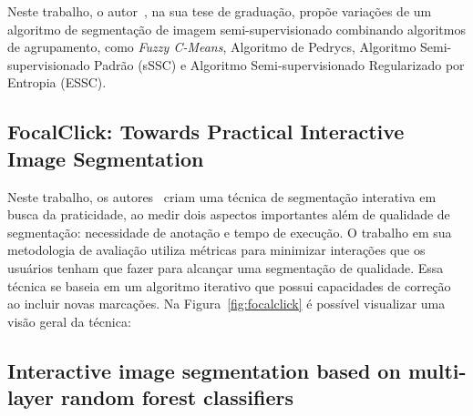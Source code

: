 Neste trabalho, o autor~, na sua tese de
graduação, propõe variações de um algoritmo de segmentação de imagem
semi-supervisionado combinando algoritmos de agrupamento, como
\textit{Fuzzy C-Means}, Algoritmo de Pedrycs, Algoritmo
Semi-supervisionado Padrão (sSSC) e Algoritmo Semi-supervisionado
Regularizado por Entropia (ESSC).

\subsection{FocalClick: Towards Practical Interactive Image Segmentation}\label{sec:focalclick}

Neste trabalho, os autores~ criam uma técnica de
segmentação interativa em busca da praticidade, ao medir dois aspectos
importantes além de qualidade de segmentação: necessidade de anotação
e tempo de execução. O trabalho em sua metodologia de avaliação
utiliza métricas para minimizar interações que os usuários tenham que
fazer para alcançar uma segmentação de qualidade. Essa técnica se
baseia em um algoritmo iterativo que possui capacidades de correção ao
incluir novas marcações. Na Figura~\ref{fig:focalclick} é possível visualizar uma
visão geral da técnica:


\begin{figure}[!h]
        \captionsetup{width=12cm}
		\centering
\end{figure}


\subsection{Interactive image segmentation based on multi-layer
random forest classifiers}\label{sec:superpixel-random-forest}

